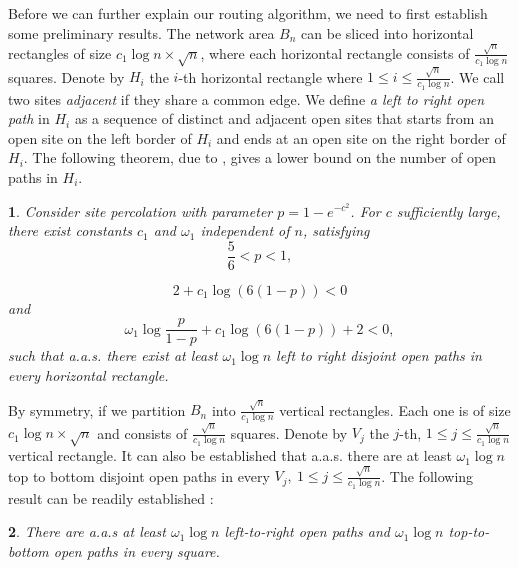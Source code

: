 \documentclass[english]{IEEEtran}
\theoremstyle{plain}
\newtheorem{thm}{\protect\theoremname}
\theoremstyle{plain}
\newtheorem{cor}[thm]{\protect\corollaryname}
\theoremstyle{plain}
\theoremstyle{remark}
\providecommand{\corollaryname}{Corollary}
\providecommand{\theoremname}{Theorem}
\begin{document}
Before we can further explain our routing algorithm, we need to first
establish some preliminary results. The network area $B_{n}$ can
be sliced into horizontal rectangles of size $c_{1}\log n\times\sqrt{n}$,
where each horizontal rectangle consists of $\frac{\sqrt{n}}{c_{1}\log n}$
squares. Denote by $H_{i}$ the $i$-th horizontal rectangle where
$1\leq i\leq\frac{\sqrt{n}}{c_{1}\log n}$. We call two sites \emph{adjacent}
if they share a common edge. We define \emph{a left to right open
path }in $H_{i}$ as a sequence of distinct and adjacent open sites
that starts from an open site on the left border of $H_{i}$ and ends
at an open site on the right border of $H_{i}$. The following theorem,
due to \cite[Theorem 4.3.9]{Franceschetti07Random}, gives a lower
bound on the number of open paths in $H_{i}$.
\begin{thm}
\cite[Theorem 4.3.9]{Franceschetti07Random}\label{lem:number of open paths}Consider
site percolation with parameter $p=1-e^{-c^{2}}$. For $c$ sufficiently
large, there exist constants $c_{1}$ and $\omega_{1}$ independent
of $n$, satisfying 
\begin{equation}
\frac{5}{6}<p<1,\label{eq:condition_1}
\end{equation}
 
\begin{equation}
2+c_{1}\log\left(6\left(1-p\right)\right)<0\label{eq:condition_2}
\end{equation}
 and 
\begin{equation}
\omega_{1}\log\frac{p}{1-p}+c_{1}\log\left(6\left(1-p\right)\right)+2<0,\label{eq:condition_3}
\end{equation}
such that a.a.s. there exist at least $\omega_{1}\log n$ left to
right disjoint open paths in every horizontal rectangle. 
\end{thm}
By symmetry, if we partition $B_{n}$ into $\frac{\sqrt{n}}{c_{1}\log n}$
vertical rectangles. Each one is of size $c_{1}\log n\times\sqrt{n}$
and consists of $\frac{\sqrt{n}}{c_{1}\log n}$ squares. Denote by
$V_{j}$ the $j$-th, $1\leq j\leq\frac{\sqrt{n}}{c_{1}\log n}$ vertical
rectangle. It can also be established that a.a.s. there are at least
$\omega_{1}\log n$ top to bottom disjoint open paths in every $V_{j},\:1\leq j\leq\frac{\sqrt{n}}{c_{1}\log n}$.
The following result can be readily established \cite{Franceschetti07Closing}:
\begin{cor}
\label{cor:number of vertical and horizontal paths}There are a.a.s
at least $\omega_{1}\log n$ left-to-right open paths and $\omega_{1}\log n$
top-to-bottom open paths in every square.
\end{cor}
\end{document}
